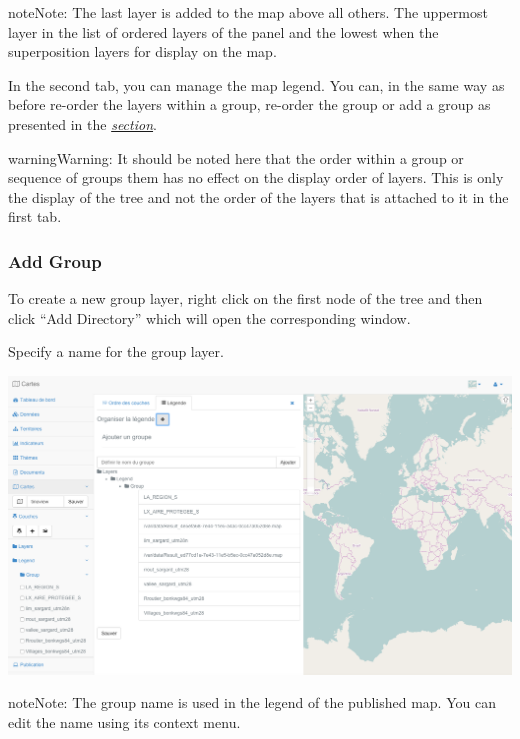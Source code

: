 \documentclass[letterpaper,10pt,english]{sphinxmanual}
\begin{document}
\begin{notice}{note}{Note:}
The last layer is added to the map above all others. The uppermost layer in the list of ordered layers of the panel and the lowest when the superposition layers for display on the map.
\end{notice}

In the second tab, you can manage the map legend. You can, in the same way as before re-order the layers within a group, re-order the group or add a group as presented in the {\hyperref[maps/layerstree:maps-layerstree-order]{\emph{section}}}.

\begin{notice}{warning}{Warning:}
It should be noted here that the order within a group or sequence of groups them has no effect on the display order of layers. This is only the display of the tree and not the order of the layers that is attached to it in the first tab.
\end{notice}


\subsubsection{Add Group}
\label{maps/layerstree:ajouter-un-groupe}\label{maps/layerstree:maps-layerstree-order}
To create a new group layer, right click on the first node of the tree and then click ``Add Directory'' which will open the corresponding window.

Specify a name for the group layer.

\includegraphics[width=1.000\linewidth]{add-group-window.png}

\begin{notice}{note}{Note:}
The group name is used in the legend of the published map. You can edit the name using its context menu.
\end{notice}
\end{document}
